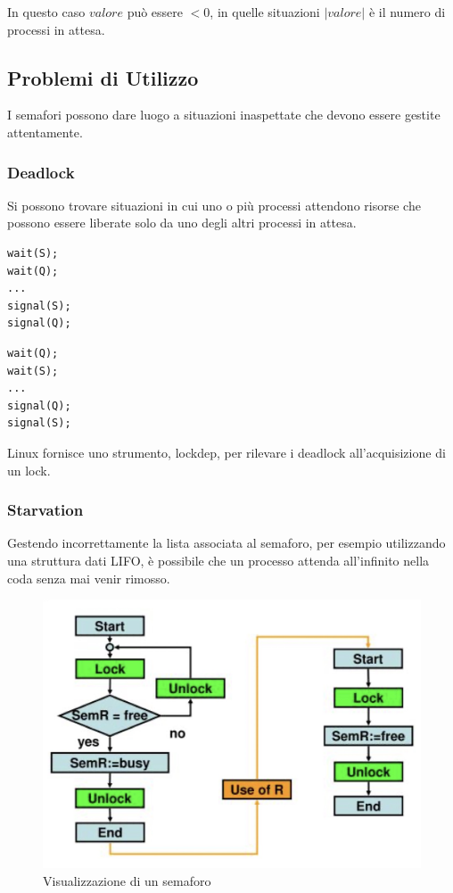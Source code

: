 In questo caso $valore$ può essere $<0$, in quelle situazioni $|valore|$ è il numero di processi in attesa.

\subsection{Problemi di Utilizzo}
I semafori possono dare luogo a situazioni inaspettate che devono essere gestite attentamente.

\subsubsection*{Deadlock}
Si possono trovare situazioni in cui uno o più processi attendono risorse che possono essere liberate solo da uno degli altri processi in attesa.

\begin{minipage}{0.45\textwidth}
    \begin{verbatim}
wait(S);
wait(Q);
...
signal(S);
signal(Q);
\end{verbatim}
\end{minipage}
\hfill
\begin{minipage}{0.45\textwidth}
    \begin{verbatim}
wait(Q);
wait(S);
...
signal(Q);
signal(S);
\end{verbatim}
\end{minipage}

Linux fornisce uno strumento, lockdep, per rilevare i deadlock all'acquisizione di un lock.

\subsubsection*{Starvation}
Gestendo incorrettamente la lista associata al semaforo, per esempio utilizzando una struttura dati LIFO, è possibile che un processo attenda all'infinito nella coda senza mai venir rimosso.

\begin{figure}[H]
    \centering
    \includegraphics[width=0.5\linewidth]{assets/semaphore.jpg}
    \caption{Visualizzazione di un semaforo}
\end{figure}
